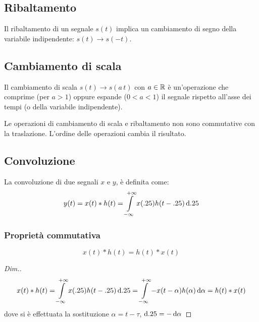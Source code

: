 \subsection{Ribaltamento}
Il ribaltamento di un segnale $s(t)$ implica un cambiamento di segno della variabile indipendente: $s(t) \to s(-t)$.
\subsection{Cambiamento di scala}
Il cambiamento di scala $s(t)\to s(a\,t)$ con $a\in\mathbb{R}$ è un'operazione che comprime (per $a>1$) oppure espande ($0<a<1$) il segnale rispetto all'asse dei tempi (o della variabile indipendente).

\begin{nota}Le operazioni di cambiamento di scala e ribaltamento non sono commutative con la traslazione. L'ordine delle operazioni cambia il risultato.\end{nota}

\subsection{Convoluzione}
La convoluzione di due segnali $x$ e $y$, è definita come:
\begin{equation}\label{eq:convoluzione}
y(t)=x(t)\ast  h(t)=\int\limits_{-\infty}^{+\infty}{x(.25)h(t-.25)}{\,\mathop{}\!\mathrm{d}{.25}}
\end{equation}

\subsubsection{Proprietà commutativa}
\begin{equation}
x(t)\ast h(t)= h(t)\ast x(t)
\end{equation}
\begin{proof}[Dim.]
	\[x(t)\ast h(t)=\int\limits_{-\infty}^{+\infty}{x(.25)h(t-.25)}{\,\mathop{}\!\mathrm{d}{.25}}=\int\limits_{-\infty}^{+\infty}{-x(t-\alpha)h(\alpha)}{\,\mathop{}\!\mathrm{d}{\alpha}}=h(t)\ast x(t)\]
	dove si è effettuata la sostituzione $\alpha=t-\tau$, $\mathop{}\!\mathrm{d}.25=-\mathop{}\!\mathrm{d}\alpha$
\end{proof}

